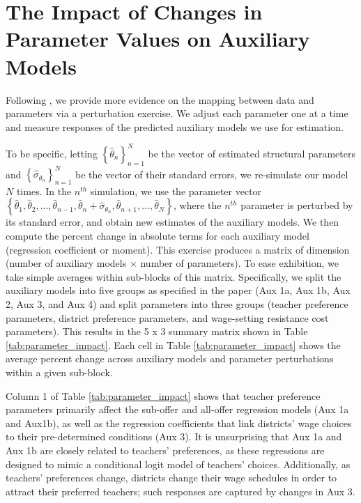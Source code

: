 \documentclass[notitlepage,12pt]{article}%
\begin{document}
\section{The Impact of Changes in Parameter Values on Auxiliary Models}

Following \citet{einav2018provider}, we provide more evidence on the mapping
between data and parameters via a perturbation exercise. We adjust each
parameter one at a time and measure responses of the predicted auxiliary
models we use for estimation.

To be specific, letting $\left\{  \widehat{\theta}_{n}\right\}  _{n=1}^{N}$ be
the vector of estimated structural parameters and $\left\{  \widehat{\sigma
}_{\theta_{n}}\right\}  _{n=1}^{N}$ be the vector of their standard errors, we
re-simulate our model $N$ times. In the $n^{th}$ simulation, we use the
parameter vector $\left\{  \widehat{\theta}_{1},\widehat{\theta}%
_{2},...,\widehat{\theta}_{n-1},\widehat{\theta}_{n}+\widehat{\sigma}%
_{\theta_{n}},\widehat{\theta}_{n+1},...,\widehat{\theta}_{N}\right\}  $,
where the $n^{th}$ parameter is perturbed by its standard error, and obtain
new estimates of the auxiliary models. We then compute the percent change in
absolute terms for each auxiliary model (regression coefficient or moment).
This exercise produces a matrix of dimension (number of auxiliary models
$\times$ number of parameters). To ease exhibition, we take simple averages
within sub-blocks of this matrix. Specifically, we split the auxiliary models
into five groups as specified in the paper (Aux 1a, Aux 1b, Aux 2, Aux 3, and
Aux 4) and split parameters into three groups (teacher preference parameters,
district preference parameters, and wage-setting resistance cost parameters).
This results in the 5 x 3 summary matrix shown in Table
\ref{tab:parameter_impact}. Each cell in Table \ref{tab:parameter_impact}
shows the average percent change across auxiliary models and parameter
perturbations within a given sub-block.

Column 1 of Table \ref{tab:parameter_impact} shows that teacher preference
parameters primarily affect the sub-offer and all-offer regression models (Aux
1a and Aux1b), as well as the regression coefficients that link districts'
wage choices to their pre-determined conditions (Aux 3). It is unsurprising
that Aux 1a and Aux 1b are closely related to teachers' preferences, as these
regressions are designed to mimic a conditional logit model of teachers'
choices. Additionally, as teachers' preferences change, districts change their
wage schedules in order to attract their preferred teachers; such responses
are captured by changes in Aux 3.
\end{document}
